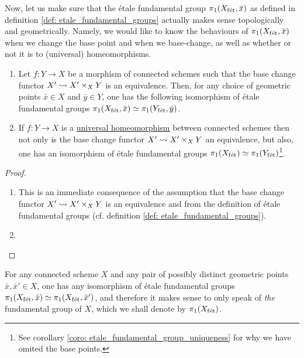         Now, let us make sure that the \'etale fundamental group $\pi_1(X_{\mathrm{f\acute{e}t}}, \bar{x})$ as defined in definition \ref{def: etale_fundamental_groups} actually makes sense topologically and geometrically. Namely, we would like to know the behaviours of $\pi_1(X_{\mathrm{f\acute{e}t}}, \bar{x})$ when we change the base point and when we base-change, as well as whether or not it is  to (universal) homeomorphisms.
        \begin{proposition} \label{prop: the_etale_fundamental_group_as_a_topological_invariance}
            \noindent
            \begin{enumerate}
                \item Let $f: Y \to X$ be a morphism of connected schemes such that the base change functor $X' \mapsto X' \x_X Y$ is an equivalence. Then, for any choice of geometric points $\bar{x} \in X$ and $\bar{y} \in Y$, one has the following isomorphism of \'etale fundamental groups $\pi_1(X_{\mathrm{f\acute{e}t}}, \bar{x}) \simeq \pi_1(Y_{\mathrm{f\acute{e}t}}, \bar{y})$.
                \item If $f: Y \to X$ is a \href{https://stacks.math.columbia.edu/tag/04DC}{\underline{universal homeomorphism}} between connected schemes then not only is the base change functor $X' \mapsto X' \x_X Y$ an equivalence, but also, one has an isomorphism of \'etale fundamental groups $\pi_1(X_{\mathrm{f\acute{e}t}}) \simeq \pi_1(Y_{\mathrm{f\acute{e}t}})$\footnote{See corollary \ref{coro: etale_fundamental_group_uniqueness} for why we have omited the base points.}. 
            \end{enumerate}
        \end{proposition}
            \begin{proof}
                \noindent
                \begin{enumerate}
                    \item This is an immediate consequence of the assumption that the base change functor $X' \mapsto X' \x_X Y$ is an equivalence and from the definition of \'etale fundamental groups (cf. definition \ref{def: etale_fundamental_groups}).
                    \item 
                \end{enumerate}
            \end{proof}
        \begin{corollary} \label{coro: etale_fundamental_group_uniqueness}
            For any connected scheme $X$ and any pair of possibly distinct geometric points $\bar{x}, \bar{x}' \in X$, one has any isomorphism of \'etale fundamental groups $\pi_1(X_{\mathrm{f\acute{e}t}}, \bar{x}) \simeq \pi_1(X_{\mathrm{f\acute{e}t}}, \bar{x}')$, and therefore it makes sense to only speak of \textit{the} fundamental group of $X$, which we shall denote by $\pi_1(X_{\mathrm{f\acute{e}t}})$.
        \end{corollary}
        

